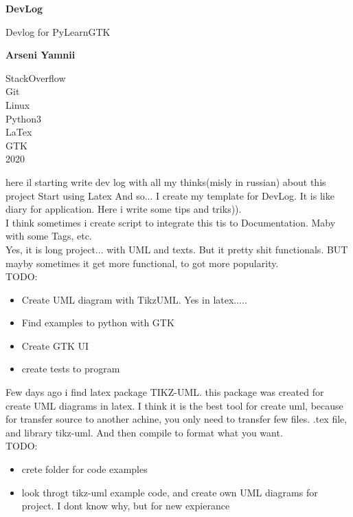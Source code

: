 \documentclass{article}
\begin{document}
\begin{titlepage}
   \begin{center}
       \vspace*{1cm}

       \textbf{DevLog}

       \vspace{0.5cm}
        Devlog for PyLearnGTK

       \vspace{1.5cm}

       \textbf{Arseni Yamnii}

       \vfill


       \vspace{0.8cm}



       StackOverflow\\
       Git\\
       Linux\\
       Python3\\
       LaTex\\
       GTK\\
       2020

   \end{center}
\end{titlepage}
\tableofcontents
\newpage
{}
here il starting write dev log with all my thinks(misly in russian) about this project
\newpage
{}
Start using Latex
And so... I create my template for DevLog. It is like diary for application. Here i write some tips and triks)).\\
I think sometimes i create script to integrate this tis to Documentation. Maby with some Tags, etc.\\
Yes, it is long project... with UML and texts. But it pretty shit functionals. BUT mayby sometimes it get more functional, to got more popularity.\\
TODO:
\begin{itemize}
  \item Create UML diagram with TikzUML. Yes in latex.....
  \item Find examples to python with GTK
  \item Create GTK UI
  \item create tests to program
\end{itemize}
Few days ago i find latex package TIKZ-UML. this package was created for create UML diagrams in latex. I think it is the best tool for create uml, because for transfer source to another achine, you only need to transfer few files. .tex file, and library tikz-uml. And then compile to format what you want.\\
TODO:
\begin{itemize}
  \item crete folder for code examples
  \item look throgt tikz-uml example code, and create own UML diagrams for project. I dont know why, but for new expierance
\end{itemize}
\end{document}

